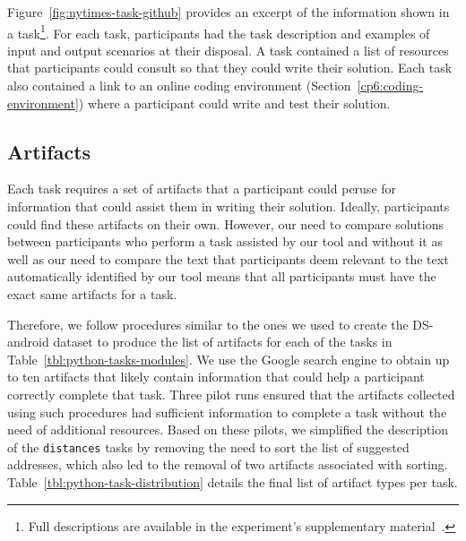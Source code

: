 Figure~\ref{fig:nytimes-task-github} provides an excerpt of the information shown in a task\footnote{Full descriptions are available in the experiment's supplementary material~\cite{cp6_supplementary_material}.}.
For each task, participants had the task description and examples of input and output scenarios at their disposal. A task contained a list of resources that participants could consult 
so that they could write their solution.
Each task also contained a link to an online coding environment (Section~\ref{cp6:coding-environment})
where a participant could write and test their solution. 










\subsection{Artifacts}
\label{cp6:experiment-artifacts}




Each task requires a set of artifacts that a participant could peruse for information that could assist them in writing their solution.
Ideally, participants could find these artifacts on their own. However, our need to compare solutions between participants who perform a task 
assisted by our tool and without it as well as our need to compare the text that participants deem relevant to the text
automatically identified by our tool means that all participants must have the exact same artifacts for a task.


Therefore,
we follow procedures similar to the ones we used to create the \acs{DS-android} dataset to produce the list of artifacts for each of the tasks in Table~\ref{tbl:python-tasks-modules}. 
We use the Google search engine to obtain up to ten artifacts that likely contain 
information that could help a participant correctly complete that task. 
Three pilot runs ensured that the artifacts collected using such procedures had sufficient information to complete a task without 
the need of additional resources. Based on these pilots, we simplified the description of the \texttt{distances} tasks by removing the need to sort the list of suggested addresses, which also led to the removal of two artifacts associated with sorting. Table~\ref{tbl:python-task-distribution} details the final list 
of artifact types per task.





